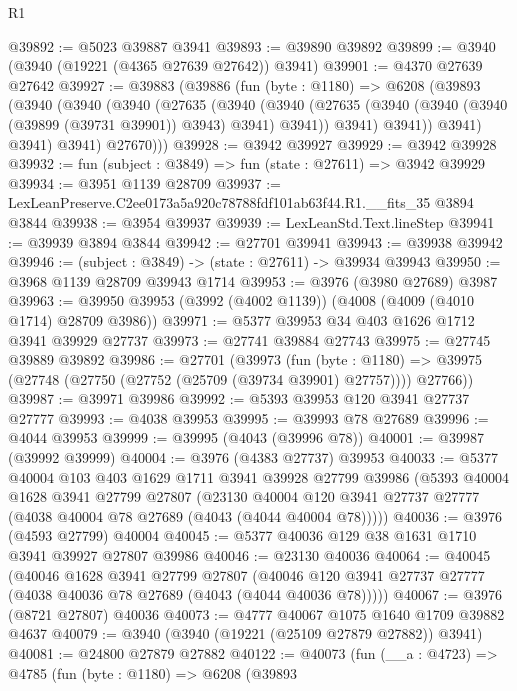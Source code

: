 \begin{lexlean}{R1}
\begin{coremodule}
@39892 := @5023 @39887 @3941
@39893 := @39890 @39892
@39899 := @3940 (@3940 (@19221 (@4365 @27639 @27642)) @3941)
@39901 := @4370 @27639 @27642
@39927 := @39883
    (@39886
      (fun (byte : @1180) =>
      @6208
        (@39893
          (@3940
            (@3940
              (@3940
                (@27635
                  (@3940
                    (@3940
                      (@27635 (@3940 (@3940 (@3940 (@39899 (@39731 @39901)) @3943) @3941) @3941))
                      @3941)
                    @3941))
                @3941)
              @3941)
            @3941)
          @27670)))
@39928 := @3942 @39927
@39929 := @3942 @39928
@39932 := fun (subject : @3849) => fun (state : @27611) => @3942 @39929
@39934 := @3951 @1139 @28709
@39937 := LexLeanPreserve.C2ee0173a5a920c78788fdf101ab63f44.R1.__fits_35 @3894 @3844
@39938 := @3954 @39937
@39939 := LexLeanStd.Text.lineStep
@39941 := @39939 @3894 @3844
@39942 := @27701 @39941
@39943 := @39938 @39942
@39946 := (subject : @3849) -> (state : @27611) -> @39934 @39943
@39950 := @3968 @1139 @28709 @39943 @1714
@39953 := @3976 (@3980 @27689) @3987
@39963 := @39950 @39953 (@3992 (@4002 @1139)) (@4008 (@4009 (@4010 @1714) @28709 @3986))
@39971 := @5377 @39953 @34 @403 @1626 @1712 @3941 @39929 @27737
@39973 := @27741 @39884 @27743
@39975 := @27745 @39889 @39892
@39986 := @27701
    (@39973
      (fun (byte : @1180) =>
      @39975 (@27748 (@27750 (@27752 (@25709 (@39734 @39901) @27757)))) @27766))
@39987 := @39971 @39986
@39992 := @5393 @39953 @120 @3941 @27737 @27777
@39993 := @4038 @39953
@39995 := @39993 @78 @27689
@39996 := @4044 @39953
@39999 := @39995 (@4043 (@39996 @78))
@40001 := @39987 (@39992 @39999)
@40004 := @3976 (@4383 @27737) @39953
@40033 := @5377
    @40004
    @103
    @403
    @1629
    @1711
    @3941
    @39928
    @27799
    @39986
    (@5393
      @40004
      @1628
      @3941
      @27799
      @27807
      (@23130 @40004 @120 @3941 @27737 @27777 (@4038 @40004 @78 @27689 (@4043 (@4044 @40004 @78)))))
@40036 := @3976 (@4593 @27799) @40004
@40045 := @5377 @40036 @129 @38 @1631 @1710 @3941 @39927 @27807 @39986
@40046 := @23130 @40036
@40064 := @40045
    (@40046
      @1628
      @3941
      @27799
      @27807
      (@40046 @120 @3941 @27737 @27777 (@4038 @40036 @78 @27689 (@4043 (@4044 @40036 @78)))))
@40067 := @3976 (@8721 @27807) @40036
@40073 := @4777 @40067 @1075 @1640 @1709 @39882 @4637
@40079 := @3940 (@3940 (@19221 (@25109 @27879 @27882)) @3941)
@40081 := @24800 @27879 @27882
@40122 := @40073
    (fun (__a : @4723) =>
    @4785
      (fun (byte : @1180) =>
      @6208
        (@39893

\end{coremodule}
\end{lexlean}
